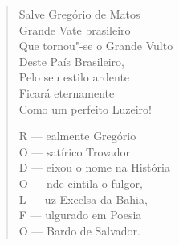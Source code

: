 \begin{verse}
Salve Gregório de Matos \\
Grande Vate brasileiro \\
Que tornou"-se o Grande Vulto \\
Deste País Brasileiro, \\
Pelo seu estilo ardente \\
Ficará eternamente \\
Como um perfeito Luzeiro! 
\pagebreak

R --- ealmente Gregório \\
O --- satírico Trovador \\
D --- eixou o nome na História \\
O --- nde cintila o fulgor, \\
L --- uz Excelsa da Bahia, \\
F --- ulgurado em Poesia \\
O --- Bardo de Salvador. 

\end{verse}
